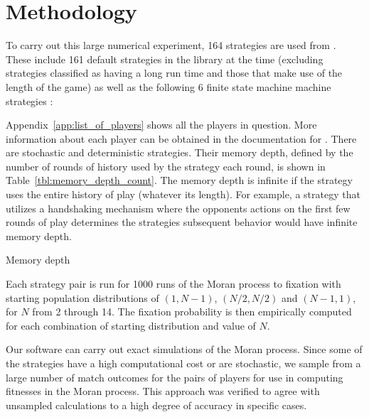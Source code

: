 \documentclass{article}
\begin{document}
\section{Methodology}\label{sec:methodology}

To carry out this large numerical experiment, 164 strategies are used from
\cite{axelrodproject}. These include 161 default strategies in the library at
the time (excluding strategies classified as having a long run time and those
that make use of the length of the game) as well as
the following 6 finite state machine machine strategies \cite{Ashlock2006}:


Appendix~\ref{app:list_of_players} shows all the players in question. More
information about each player can be obtained in the documentation for
\cite{axelrodproject}. There are stochastic and
deterministic strategies. Their memory
depth, defined by the number of rounds of history used by the strategy each round,
is shown in Table~\ref{tbl:memory_depth_count}. The memory depth is infinite if
the strategy uses the entire history of play (whatever its length). For example,
a strategy that utilizes a handshaking mechanism where the opponents actions
on the first few rounds of play determines the strategies subsequent behavior
would have infinite memory depth.

\begin{table}[!hbtp]
    \centering
        
        \caption{Memory depth}
        \label{tbl:memory_depth_count}
\end{table}

Each strategy pair is run for 1000 runs of the Moran process to fixation
with starting population distributions of $(1, N-1)$,
$(N/2, N/2)$ and $(N-1 , 1)$, for \(N\) from 2 through 14. The
fixation probability is then empirically computed for each combination of
starting distribution and value of \(N\).

Our software can carry out exact simulations of the Moran process. Since some of
the strategies have a high computational cost or are stochastic, we sample
from a large number of match outcomes for the pairs of players for use in computing
fitnesses in the Moran process. This approach was verified to agree with unsampled
calculations to a high degree of accuracy in specific cases.
\end{document}
